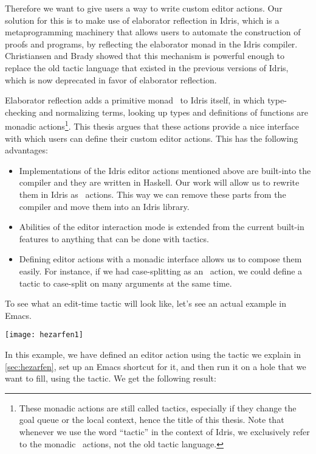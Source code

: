 Therefore we want to give users a way to write custom editor actions. Our
solution for this is to make use of elaborator reflection\cite{elabref} in
Idris, which is a metaprogramming machinery that allows users to automate the
construction of proofs and programs, by reflecting the elaborator
monad\cite{idris} in the Idris compiler. Christiansen and Brady showed that
this mechanism is powerful enough to replace the old tactic
language\cite{elabref} that existed in the previous versions of Idris, which is
now deprecated in favor of elaborator reflection.

Elaborator reflection adds a primitive monad \Elab\ to Idris itself, in which
type-checking and normalizing terms, looking up types and definitions of
functions are monadic actions\footnote{These monadic actions are still called
tactics, especially if they change the goal queue or the local context, hence the
title of this thesis. Note that whenever we use the word ``tactic'' in the
context of Idris, we exclusively refer to the monadic \Elab\ actions, not the
old tactic language.}.
This thesis argues that these actions provide a nice interface with which users
can define their custom editor actions. This has the following advantages:

\begin{itemize}
\item Implementations of the Idris editor actions mentioned above are
built-into the compiler and they are written in Haskell. Our work will allow
us to rewrite them in Idris as \Elab\ actions. This way we can remove these
parts from the compiler and move them into an Idris library.
\item Abilities of the editor interaction mode is extended from the
current built-in features to anything that can be done with tactics.
\item Defining editor actions with a monadic interface allows us to
compose them easily. For instance, if we had case-splitting as an \Elab\
action, we could define a tactic to case-split on many arguments at the same time.
\end{itemize}

To see what an edit-time tactic will look like, let's see an actual example in Emacs.

\vspace{1em}
\texttt{[image: hezarfen1]}

In this example, we have defined an editor action  using the tactic
we explain in \autoref{sec:hezarfen}, set up an Emacs shortcut for it, and then
run it on a hole that we want to fill, using the tactic. We get the following
result:

